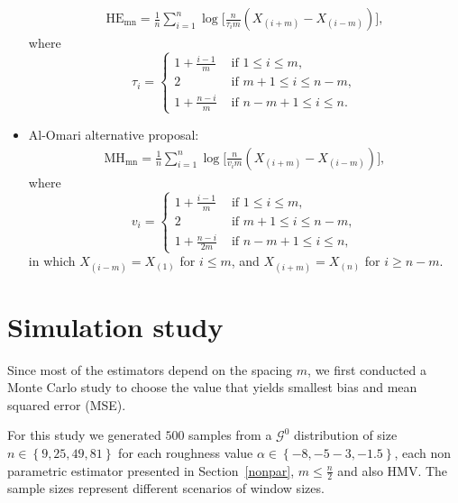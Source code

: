 \documentclass[journal]{IEEEtran}
\begin{document}
\begin{itemize}
	\begin{align}
	\text{HE}_\text{{mn}}=\frac{1}{n} \sum_{i=1}^{n} \log \Big[\frac{n}{\tau_{i} m}\left(X_{(i+m)}-X_{(i-m)}\right)\Big],
		\label{HE}
	\end{align}
	where
	\begin{equation*}
	\tau_{i}=\begin{cases}
		1+\frac{i-1}{m} & \text{ if }1 \leq i \leq m, \\
		2 & \text{ if } m+1 \leq i \leq n-m, \\
		1+\frac{n-i}{m} & \text{ if } n-m+1 \leq i \leq n.
			\end{cases}
	\end{equation*}
	\item Al-Omari alternative proposal:
	\label{MH}
	\begin{align}
	\text{MH}_\text{{mn}}=\frac{1}{n} \sum_{i=1}^{n} \log \Big[\frac{n}{v_{i} m}\left(X_{(i+m)}-X_{(i-m)}\right)\Big],
	\end{align}
where
	\begin{equation*}
	v_{i}=\begin{cases}
	1+\frac{i-1}{m} & \text{ if }1 \leq i \leq m, \\
	2 & \text{ if } m+1 \leq i \leq n-m, \\
	1+\frac{n-i}{2 m} & \text{ if } n-m+1 \leq i \leq n,
		\end{cases}
	\end{equation*}
in which $X_{(i-m)}=X_{(1)}$ for $i \leq m$, and $X_{(i+m)}=X_{(n)}$ for $i \geq n-m$.
\end{itemize}

\section{Simulation study}\label{simulation}

Since most of the estimators depend on the spacing $m$, we first conducted a Monte Carlo study  to choose the value that yields smallest bias and mean squared error (MSE). %

For this study we generated $500$ samples from a $\mathcal{G}^0$ distribution of size $n \in\left\lbrace 9,25,49,81\right\rbrace $ for each roughness value $\alpha \in\left\lbrace -8,-5-3,-1.5\right\rbrace $, each non parametric estimator presented in Section~\ref{nonpar}, $m \leq \frac{n}{2}$ and also HMV. 
The sample sizes represent different scenarios of window sizes. 
\end{document}
